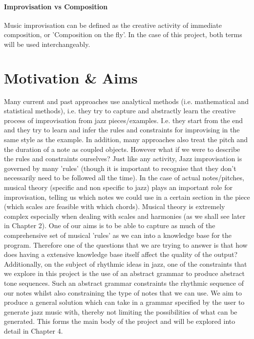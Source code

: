 \documentclass[pdftex,12pt,a4paper]{report}
\begin{document}
\paragraph{Improvisation vs Composition}
Music improvisation can be defined as the creative activity of immediate composition, or 'Composition on the fly'. In the case of this project, both terms will be used interchangeably.

\section{Motivation \& Aims}
Many current and past approaches use analytical methods (i.e. mathematical and statistical methods), i.e. they try to capture and abstractly learn the creative process of improvisation from jazz pieces/examples. I.e. they start from the end and they try to learn and infer the rules and constraints for improvising in the same style as the example. In addition, many approaches also treat the pitch and the duration of a note as coupled objects. 
However what if we were to describe the rules and constraints ourselves? Just like any activity, Jazz improvisation is governed by many 'rules' (though it is important to recognise that they don't necessarily need to be followed all the time). In the case of actual notes/pitches, musical theory (specific and non specific to jazz) plays an important role for improvisation, telling us which notes we could use in a certain section in the piece (which scales are feasible with which chords). Musical theory is extremely complex especially when dealing with scales and harmonies (as we shall see later in Chapter 2). One of our aims is to be able to capture as much of the comprehensive set of musical 'rules' as we can into a knowledge base for the program. Therefore one of the questions that we are trying to answer is that how does having a extensive knowledge base itself affect the quality of the output? Additionally, on the subject of rhythmic ideas in jazz, one of the constraints that we explore in this project is the use of an abstract grammar to produce abstract tone sequences. Such an abstract grammar constraints the rhythmic sequence of our notes whilst also constraining the type of notes that we can use. We aim to produce a general solution which can take in a grammar specified by the user to generate jazz music with, thereby not limiting the possibilities of what can be generated. This forms the main body of the project and will be explored into detail in Chapter 4.
\end{document}
